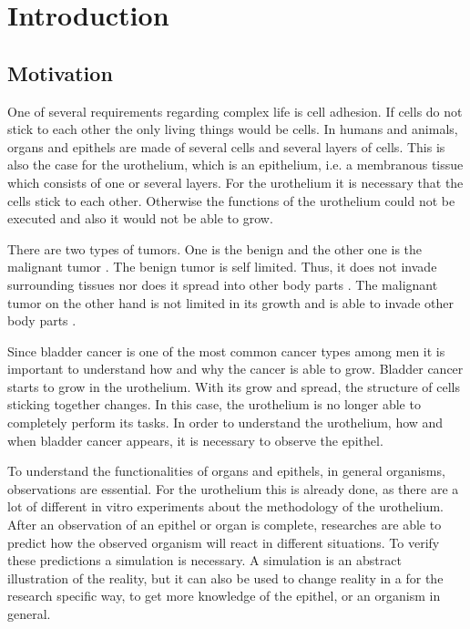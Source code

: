\chapter{Introduction}
\section{Motivation}
One of several requirements regarding complex life is cell adhesion. If cells do not stick to each other the only living things would be cells. 
In humans and animals, organs and epithels are made of several cells and several layers of cells. This is also the case for the urothelium, which is an epithelium, i.e. a membranous tissue which consists of one or several layers. For the urothelium it is necessary that the cells stick to each other. Otherwise the functions of the urothelium could not be executed and also it would not be able to grow.%

There are two types of tumors. One is the benign and the other one is the malignant tumor \cite{Poplawski2009}. The benign tumor is self limited. Thus, it does not invade surrounding tissues nor does it spread into other body parts \cite{Poplawski2009}. The malignant tumor on the other hand is not limited in its growth and is able to invade other body parts \cite{Poplawski2009}. 

Since bladder cancer is one of the most common cancer types among men it is important to understand how and why the cancer is able to grow. \newline
Bladder cancer starts to grow in the urothelium. With its grow and spread, the structure of cells sticking together changes. In this case, the urothelium is no longer able to completely perform its tasks. In order to understand the urothelium, how and when bladder cancer appears, it is necessary to observe the epithel.

To understand the functionalities of organs and epithels, in general organisms, observations are essential. For the urothelium this is already done, as there are a lot of different in vitro experiments about the methodology of the urothelium. After an observation of an epithel or organ is complete, researches are able to predict how the observed organism will react in different situations. To verify these predictions a simulation is necessary. A simulation is an abstract illustration of the reality, but it can also be used to change reality in a for the research specific way, to get more knowledge of the epithel, or an organism in general.

